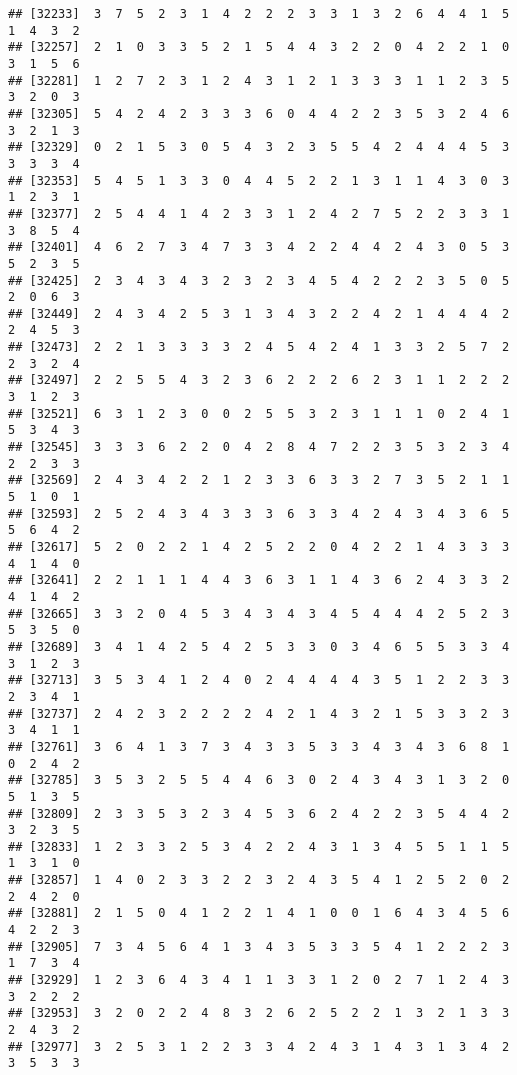 \documentclass[
]{article}
\begin{document}
\begin{verbatim}
## [32233]  3  7  5  2  3  1  4  2  2  2  3  3  1  3  2  6  4  4  1  5  1  4  3  2
## [32257]  2  1  0  3  3  5  2  1  5  4  4  3  2  2  0  4  2  2  1  0  3  1  5  6
## [32281]  1  2  7  2  3  1  2  4  3  1  2  1  3  3  3  1  1  2  3  5  3  2  0  3
## [32305]  5  4  2  4  2  3  3  3  6  0  4  4  2  2  3  5  3  2  4  6  3  2  1  3
## [32329]  0  2  1  5  3  0  5  4  3  2  3  5  5  4  2  4  4  4  5  3  3  3  3  4
## [32353]  5  4  5  1  3  3  0  4  4  5  2  2  1  3  1  1  4  3  0  3  1  2  3  1
## [32377]  2  5  4  4  1  4  2  3  3  1  2  4  2  7  5  2  2  3  3  1  3  8  5  4
## [32401]  4  6  2  7  3  4  7  3  3  4  2  2  4  4  2  4  3  0  5  3  5  2  3  5
## [32425]  2  3  4  3  4  3  2  3  2  3  4  5  4  2  2  2  3  5  0  5  2  0  6  3
## [32449]  2  4  3  4  2  5  3  1  3  4  3  2  2  4  2  1  4  4  4  2  2  4  5  3
## [32473]  2  2  1  3  3  3  3  2  4  5  4  2  4  1  3  3  2  5  7  2  2  3  2  4
## [32497]  2  2  5  5  4  3  2  3  6  2  2  2  6  2  3  1  1  2  2  2  3  1  2  3
## [32521]  6  3  1  2  3  0  0  2  5  5  3  2  3  1  1  1  0  2  4  1  5  3  4  3
## [32545]  3  3  3  6  2  2  0  4  2  8  4  7  2  2  3  5  3  2  3  4  2  2  3  3
## [32569]  2  4  3  4  2  2  1  2  3  3  6  3  3  2  7  3  5  2  1  1  5  1  0  1
## [32593]  2  5  2  4  3  4  3  3  3  6  3  3  4  2  4  3  4  3  6  5  5  6  4  2
## [32617]  5  2  0  2  2  1  4  2  5  2  2  0  4  2  2  1  4  3  3  3  4  1  4  0
## [32641]  2  2  1  1  1  4  4  3  6  3  1  1  4  3  6  2  4  3  3  2  4  1  4  2
## [32665]  3  3  2  0  4  5  3  4  3  4  3  4  5  4  4  4  2  5  2  3  5  3  5  0
## [32689]  3  4  1  4  2  5  4  2  5  3  3  0  3  4  6  5  5  3  3  4  3  1  2  3
## [32713]  3  5  3  4  1  2  4  0  2  4  4  4  4  3  5  1  2  2  3  3  2  3  4  1
## [32737]  2  4  2  3  2  2  2  2  4  2  1  4  3  2  1  5  3  3  2  3  3  4  1  1
## [32761]  3  6  4  1  3  7  3  4  3  3  5  3  3  4  3  4  3  6  8  1  0  2  4  2
## [32785]  3  5  3  2  5  5  4  4  6  3  0  2  4  3  4  3  1  3  2  0  5  1  3  5
## [32809]  2  3  3  5  3  2  3  4  5  3  6  2  4  2  2  3  5  4  4  2  3  2  3  5
## [32833]  1  2  3  3  2  5  3  4  2  2  4  3  1  3  4  5  5  1  1  5  1  3  1  0
## [32857]  1  4  0  2  3  3  2  2  3  2  4  3  5  4  1  2  5  2  0  2  2  4  2  0
## [32881]  2  1  5  0  4  1  2  2  1  4  1  0  0  1  6  4  3  4  5  6  4  2  2  3
## [32905]  7  3  4  5  6  4  1  3  4  3  5  3  3  5  4  1  2  2  2  3  1  7  3  4
## [32929]  1  2  3  6  4  3  4  1  1  3  3  1  2  0  2  7  1  2  4  3  3  2  2  2
## [32953]  3  2  0  2  2  4  8  3  2  6  2  5  2  2  1  3  2  1  3  3  2  4  3  2
## [32977]  3  2  5  3  1  2  2  3  3  4  2  4  3  1  4  3  1  3  4  2  3  5  3  3

\end{verbatim}
\end{document}
